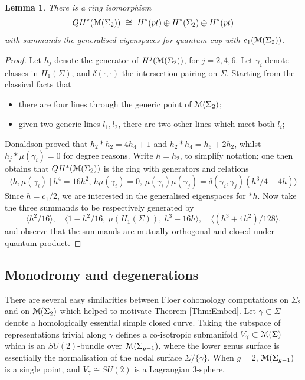 \documentclass[reqno,10pt]{amsart}
\numberwithin{equation}{section}
\newcommand{\scrM}{\EuScript{M}}
\newtheorem{Lemma}[thm]{Lemma}
\theoremstyle{remark}
\begin{document}
\begin{Lemma} \label{Lem:QHmodulispace}
There is a ring isomorphism 
\[
QH^*(\scrM(\Sigma_2)) \ \cong \ H^*(pt) \oplus H^*(\Sigma_2) \oplus H^*(pt)
\]
with summands the generalised eigenspaces for quantum cup with $c_1(\scrM(\Sigma_2))$.
\end{Lemma}

\begin{proof}
Let $h_j$ denote the generator of $H^j(\scrM(\Sigma_2))$, for $j=2,4,6$.  Let $\gamma_i$ denote classes in $H_1(\Sigma)$, and $\delta(\cdot,\cdot)$ the intersection pairing on $\Sigma$.  Starting from the classical facts that
\begin{itemize}
\item there are four lines through the generic point of $\scrM(\Sigma_2)$;
\item given two generic lines $l_1,l_2$, there are  two other lines which meet both $l_i$;
\end{itemize}
Donaldson \cite{Donaldson} proved that $h_2\ast h_2 = 4h_4+1$ and $h_2\ast h_4 = h_6 + 2h_2$, whilst  $h_j \ast \mu(\gamma_i)=0$ for degree reasons.  Write $h=h_2$, to simplify notation;  one then obtains that $QH^*(\scrM(\Sigma_2))$ is the ring with generators and relations
\[
 \langle h, \mu(\gamma_i) \ | \ h^4=16h^2, \, h\mu(\gamma_i)=0, \, \mu(\gamma_i)\mu(\gamma_j) = \delta(\gamma_i,\gamma_j)(h^3/4-4h)\rangle
\]
Since $h=c_1/2$, we are interested in the generalised eigenspaces for $\ast h$.  Now take the three summands to be respectively generated  by 
\[
\langle h^2/16\rangle, \quad \langle 1-h^2/16,  \ \mu(H_1(\Sigma)), \ h^3-16h\rangle, \quad \langle (h^3+4h^2)/128\rangle.
\]   and observe that the summands are mutually orthogonal and closed under quantum product.
\end{proof}


\subsection{Monodromy and degenerations\label{Subsec:Monodromy}}

There are several easy similarities between Floer cohomology computations on $\Sigma_2$ and on $\scrM(\Sigma_2)$ which helped to motivate  Theorem \ref{Thm:Embed}.
 Let $\gamma\subset \Sigma$ denote a homologically essential simple closed curve.   Taking the subspace of representations trivial along $\gamma$ defines a co-isotropic submanifold $V_{\gamma} \subset \scrM(\Sigma)$ which is an $SU(2)$-bundle over $\scrM(\Sigma_{g-1})$, where the lower genus surface is essentially the normalisation of the nodal surface $\Sigma/\{\gamma\}$. When $g=2$, $\scrM(\Sigma_{g-1})$ is a single point, and $V_{\gamma} \cong SU(2)$ is a Lagrangian 3-sphere.
\end{document}
